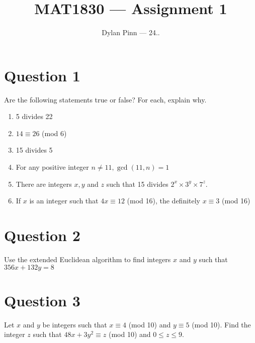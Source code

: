 \documentclass[11pt]{article}
\begin{document}
\title{MAT1830 --- Assignment 1}
\author{Dylan Pinn --- 24..} %
\maketitle

\section*{Question 1}
Are the following statements true or false? For each, explain why.
\begin{enumerate}[label= (\alph*)]
\item 5 divides 22
\item $14 \equiv 26$ (mod 6)
\item 15 divides 5
\item For any positive integer $n \neq 11, \gcd(11, n) = 1$
\item There are integers $x, y$ and $z$ such that 15 divides $2^x \times 3^y \times 7^z$.
\item If $x$ is an integer such that $4x \equiv 12$ (mod 16), the definitely $x \equiv 3$ (mod 16)
\end{enumerate}

\section*{Question 2}
Use the extended Euclidean algorithm to find integers $x$ and $y$ such that $356x + 132y = 8$

\section*{Question 3}
Let $x$ and $y$ be integers such that $x \equiv 4$ (mod 10) and $y \equiv 5$ (mod 10).
Find the integer $z$ such that $48x + 3y^2 \equiv z$ (mod 10) and $0 \leq z \leq 9$.
\end{document}
